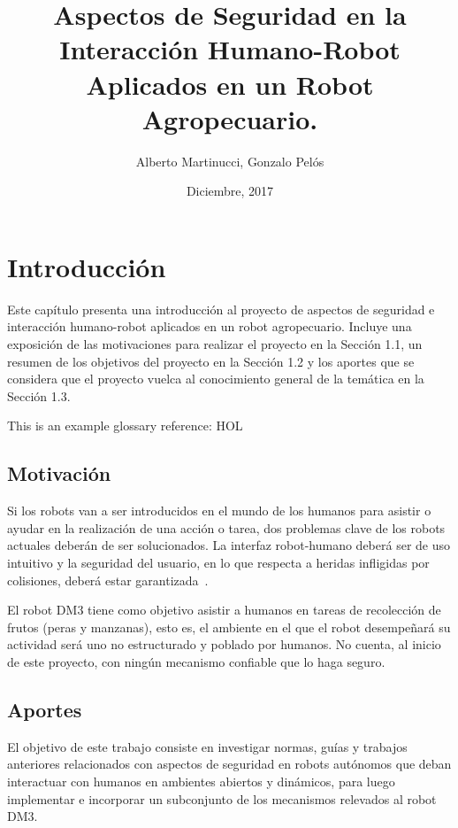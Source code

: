 \documentclass[withindex,glossary]{cam-thesis}
\title{Aspectos de Seguridad en la Interacción Humano-Robot Aplicados en un Robot Agropecuario.}
\author{Alberto Martinucci, Gonzalo Pelós}
\date{Diciembre, 2017}
\begin{document}
\frontmatter{}

\chapter{Introducción}
Este capítulo presenta una introducción al proyecto de aspectos de seguridad e interacción humano-robot aplicados en un robot agropecuario. Incluye una exposición de las motivaciones para realizar el proyecto en la Sección 1.1, un resumen de los objetivos del proyecto en la Sección 1.2 y los aportes que se considera que el proyecto vuelca al conocimiento general de la temática en la Sección 1.3.

This is an example glossary reference: \gls{HOL}
 

\section{Motivación} \label{sec: Introduccion :: Motivacion}
Si los robots van a ser introducidos en el mundo de los humanos para asistir o ayudar en la realización de una acción o tarea, dos problemas clave de los robots actuales deberán de ser solucionados. La interfaz robot-humano deberá ser de uso intuitivo y la seguridad del usuario, en lo que respecta a heridas infligidas por colisiones, deberá estar garantizada~\cite{Heinzmann2003}.

El robot DM3 tiene como objetivo asistir a humanos en tareas de recolección de frutos (peras y manzanas), esto es, el ambiente en el que el robot desempeñará su actividad será uno no estructurado y poblado por humanos. No cuenta, al inicio de este proyecto, con ningún mecanismo confiable que lo haga seguro.

\section{Aportes}
El objetivo de este trabajo consiste en investigar normas, guías y trabajos anteriores relacionados con aspectos de seguridad en robots autónomos que deban interactuar con humanos en ambientes abiertos y dinámicos, para luego implementar e incorporar un subconjunto de los mecanismos relevados al robot DM3.
\end{document}
